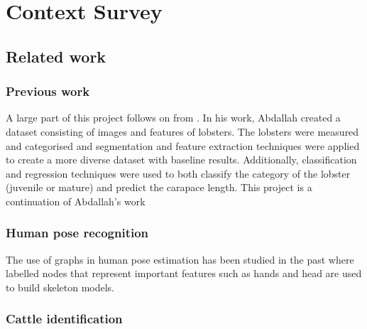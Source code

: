 \section{Context Survey}

\subsection{Related work}

\subsubsection{Previous work}
A large part of this project follows on from \cite{lobster-thesis}. In his work, Abdallah created a dataset consisting of images and features of lobsters. The lobsters were measured and categorised and segmentation and feature extraction techniques were applied to create a more diverse dataset with baseline results.  Additionally, classification and regression techniques were used to both classify the category of the lobster (juvenile or mature) and predict the carapace length. 
\n
This project is a continuation of Abdallah's work 

\subsubsection{Human pose recognition}
The use of graphs in human pose estimation has been studied in the past
\cite{human-pose} \cite{human-skeleton} where labelled nodes that represent important features such as hands and head are used to build skeleton models. 
\subsubsection{Cattle identification}

